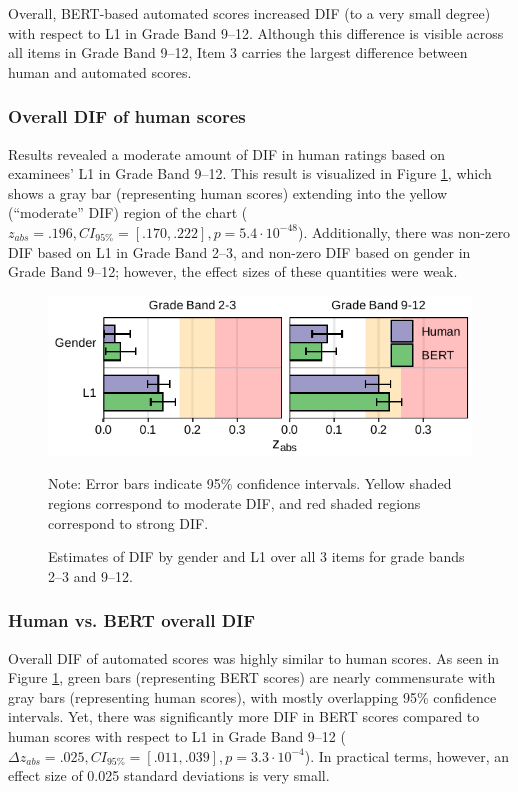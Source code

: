\documentclass [PhD] {uclathes}
\begin{document}
Overall, BERT-based automated scores increased DIF (to a very small degree) with respect to L1 in Grade Band 9–12. Although this difference is visible across all items in Grade Band 9–12, Item 3 carries the largest difference between human and automated scores. 

\subsubsection{Overall DIF of human scores}

Results revealed a moderate amount of DIF in human ratings based on examinees’ L1 in Grade Band 9–12. This result is visualized in Figure \ref{fig:zabs_ovr}, which shows a gray bar (representing human scores) extending into the yellow (“moderate” DIF) region of the chart ($z_{abs} = .196, CI_{95\%} = [.170, .222], p = 5.4 \cdot 10^{-48}$). Additionally, there was non-zero DIF based on L1 in Grade Band 2–3, and non-zero DIF based on gender in Grade Band 9–12; however, the effect sizes of these quantities were weak.

\begin{figure}[h]
    \centering
    \caption{Estimates of DIF by gender and L1 over all 3 items for grade bands 2–3 and 9–12.}    
    \includegraphics[width=4.5in]{figures/20230504_ETS-DIF_BERT_zabs_ovr_edit.pdf}
    \label{fig:zabs_ovr}
	{\newline Note: Error bars indicate 95\% confidence intervals. Yellow shaded regions correspond to moderate DIF, and red shaded regions correspond to strong DIF. \par}
\end{figure}

\subsubsection{Human vs. BERT overall DIF}

Overall DIF of automated scores was highly similar to human scores. As seen in Figure \ref{fig:zabs_ovr}, green bars (representing BERT scores) are nearly commensurate with gray bars (representing human scores), with mostly overlapping 95\% confidence intervals. Yet, there was significantly more DIF in BERT scores compared to human scores with respect to L1 in Grade Band 9–12 ($\Delta z_{abs} = .025, CI_{95\%} = [.011, .039], p = 3.3 \cdot 10^{-4}$). In practical terms, however, an effect size of 0.025 standard deviations is very small. 
\end{document}
